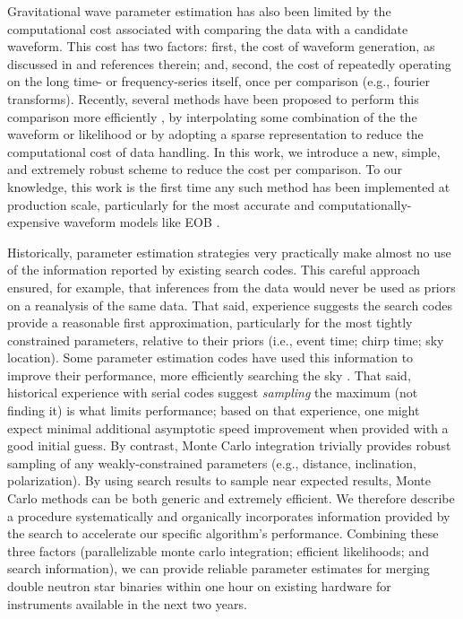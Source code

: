 Gravitational wave parameter estimation has also been limited by the computational cost associated with comparing the
data with a candidate waveform.  This cost has two factors: first, the cost of waveform generation, as discussed in
\cite{gwastro-mergers-PE-ReducedOrder-2013,2013PhRvD..87l2002S,2013PhRvD..87d4008C,gwastro-mergers-IMRPhenomP,gwastro-SpinTaylorF2-2013} and references therein; and, second,
the cost of repeatedly operating on the long time- or frequency-series itself, once per comparison (e.g., fourier
transforms).   
%
Recently, several methods have been proposed to perform this comparison more efficiently
\cite{gwastro-mergers-PE-ReducedOrder-2013,2013PhRvD..87l2002S,2013PhRvD..87d4008C,gw-astro-ReducedOrderQuadraturePE-TiglioEtAl2014}, by interpolating some combination
of the the waveform or likelihood or by adopting a sparse representation to reduce the computational cost of data
handling.  
%
In this work, we introduce a new, simple, and extremely robust scheme to reduce the cost per comparison.  
%
To our knowledge, this work is the first time any such method has been implemented at production scale, particularly for
the most accurate and computationally-expensive waveform models like EOB
\cite{gw-astro-EOBspin-Tarrachini2012,gw-astro-EOBNR-Calibrated-2009}.  


Historically, parameter estimation strategies very practically make almost no use of the information reported by
existing search codes.  This careful approach ensured, for example, that inferences from the data would never be used as priors on a
reanalysis of the same data.  
%
That said, experience suggests the search codes provide a reasonable first approximation, 
particularly for the most tightly constrained parameters, relative to their priors (i.e., event time; chirp time; sky location).  
%
Some parameter estimation codes have used this information to improve their performance, more efficiently searching the
sky .  
That said, historical experience with serial codes suggest \emph{sampling} the maximum (not finding it) is what limits
performance; based on that experience, one might expect minimal additional asymptotic speed improvement when provided
with a good initial guess.
%
By contrast, Monte Carlo integration trivially provides robust sampling of any weakly-constrained parameters (e.g.,
distance, inclination, polarization).    By using search results to sample near expected results, Monte Carlo methods
can be both generic and extremely efficient.   We therefore describe a procedure systematically and organically incorporates information provided
by the search to accelerate our specific algorithm's performance.  
%
Combining these three factors (parallelizable monte carlo integration; efficient likelihoods; and search information),
we can provide reliable parameter estimates for merging double neutron star binaries within one hour on existing
hardware for instruments available in the next two years.


